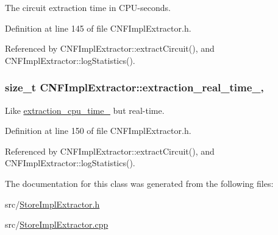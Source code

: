 The circuit extraction time in C\-P\-U-\/seconds. 



Definition at line 145 of file C\-N\-F\-Impl\-Extractor.\-h.



Referenced by C\-N\-F\-Impl\-Extractor\-::extract\-Circuit(), and C\-N\-F\-Impl\-Extractor\-::log\-Statistics().

\hypertarget{classCNFImplExtractor_ae06413cf08f868357d64545b3041aa18}{
\subsubsection[{extraction\-\_\-real\-\_\-time\-\_\-}]{\setlength{\rightskip}{0pt plus 5cm}size\-\_\-t C\-N\-F\-Impl\-Extractor\-::extraction\-\_\-real\-\_\-time\-\_\-\hspace{0.3cm}{\ttfamily [protected]}, {\ttfamily [inherited]}}}\label{classCNFImplExtractor_ae06413cf08f868357d64545b3041aa18}


Like \hyperlink{classCNFImplExtractor_ab8be06d42fd3c4b569ec22cfcf2f508e}{extraction\-\_\-cpu\-\_\-time\-\_\-} but real-\/time. 



Definition at line 150 of file C\-N\-F\-Impl\-Extractor.\-h.



Referenced by C\-N\-F\-Impl\-Extractor\-::extract\-Circuit(), and C\-N\-F\-Impl\-Extractor\-::log\-Statistics().



The documentation for this class was generated from the following files\-:\begin{DoxyCompactItemize}
\item 
src/\hyperlink{StoreImplExtractor_8h}{Store\-Impl\-Extractor.\-h}\item 
src/\hyperlink{StoreImplExtractor_8cpp}{Store\-Impl\-Extractor.\-cpp}\end{DoxyCompactItemize}
